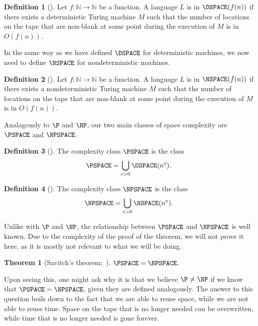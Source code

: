 \documentclass[english,12pt]{reedthesis}
\theoremstyle{plain}
\newtheorem{thm}{Theorem}[section]
\theoremstyle{definition}
\newtheorem{defn}[defn]{Definition}
\theoremstyle{remark}
\begin{document}
\begin{defn}[{\cite[Def.\ 4.1]{AB09}}]\label{def:dspace}
  Let $f\colon \mathbb{N} \rightarrow \mathbb{N}$ be a function. A language $L$ is in $\DSPACE(f(n))$ if
  there exists a deterministic Turing machine $M$ such that the number of
  locations on the tape that are non-blank at some point during the execution of
  $M$ is in $O(f(n))$.
\end{defn}

In the same way as we have defined $\DSPACE$ for deterministic machines, we now
need to define $\NSPACE$ for nondeterministic machines.

\begin{defn}[{\cite[Def. 4.1]{AB09}}]\label{def:nspace}
  Let $f\colon \mathbb{N} \rightarrow \mathbb{N}$ be a function. A language $L$ is in $\NSPACE(f(n))$ if there
  exists a nondeterministic Turing machine $M$ such that the number of locations
  on the tape that are non-blank at some point during the execution of $M$ is in
  $O(f(n))$.
\end{defn}

Analagously to $\P$ and $\NP$, our two main classes of space complexity are
$\PSPACE$ and $\NPSPACE$.

\begin{defn}[{\cite[Def.\ 4.5]{AB09}}]\label{def:pspace}
  The complexity class $\PSPACE$ is the class
  \[
    \PSPACE = \bigcup_{c > 0}\DSPACE(n^{c}).
  \]
\end{defn}

\begin{defn}[{\cite[Def.\ 4.5]{AB09}}]\label{def:npspace}
  The complexity class $\NPSPACE$ is the class
  \[
    \NPSPACE = \bigcup_{c > 0}\NSPACE(n^{c}).
  \]
\end{defn}

Unlike with $\P$ and $\NP$, the relationship between $\PSPACE$ and $\NPSPACE$ is
well known. Due to the complexity of the proof of the theorem, we will not prove
it here, as it is mostly not relevant to what we will be doing.

\begin{thm}[{Savitch's theorem;~\cite{Sav70}}]\label{thm:savitch}
  $\PSPACE = \NPSPACE$.
\end{thm}

Upon seeing this, one might ask why it is that we believe $\P \ne \NP$ if we know
that $\PSPACE = \NPSPACE$, given they are defined analogously. The answer to
this question boils down to the fact that we are able to reuse space, while we
are not able to reuse time. Space on the tape that is no longer needed can be
overwritten, while time that is no longer needed is gone forever.
\end{document}
